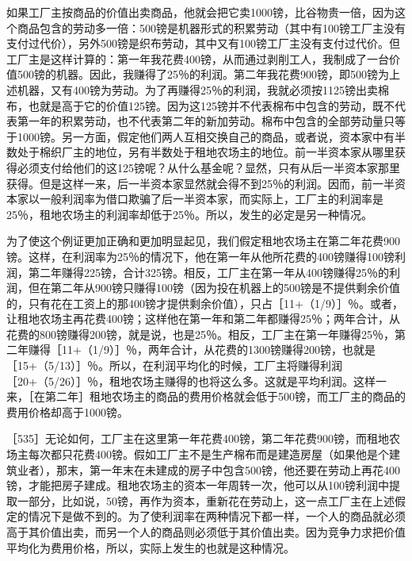 如果工厂主按商品的价值出卖商品，他就会把它卖1000镑，比谷物贵一倍，因为这个商品包含的劳动多一倍：500镑是机器形式的积累劳动（其中有100镑工厂主没有支付过代价），另外500镑是织布劳动，其中又有100镑工厂主没有支付过代价。但工厂主是这样计算的：第一年我花费400镑，从而通过剥削工人，我制成了一台价值500镑的机器。因此，我赚得了25％的利润。第二年我花费900镑，即500镑为上述机器，又有400镑为劳动。为了再赚得25％的利润，我就必须按1125镑出卖棉布，也就是高于它的价值125镑。因为这125镑并不代表棉布中包含的劳动，既不代表第一年的积累劳动，也不代表第二年的新加劳动。棉布中包含的全部劳动量只等于1000镑。另一方面，假定他们两人互相交换自己的商品，或者说，资本家中有半数处于棉织厂主的地位，另有半数处于租地农场主的地位。前一半资本家从哪里获得必须支付给他们的这125镑呢？从什么基金呢？显然，只有从后一半资本家那里获得。但是这样一来，后一半资本家显然就会得不到25％的利润。因而，前一半资本家以一般利润率为借口欺骗了后一半资本家，而实际上，工厂主的利润率是25％，租地农场主的利润率却低于25％。所以，发生的必定是另一种情况。

为了使这个例证更加正确和更加明显起见，我们假定租地农场主在第二年花费900镑。这样，在利润率为25％的情况下，他在第一年从他所花费的400镑赚得100镑利润，第二年赚得225镑，合计325镑。相反，工厂主在第一年从400镑赚得25％的利润，但在第二年从900镑只赚得100镑（因为投在机器上的500镑是不提供剩余价值的，只有花在工资上的那400镑才提供剩余价值），只占［11+（1/9）］％。或者，让租地农场主再花费400镑；这样他在第一年和第二年都赚得25％；两年合计，从花费的800镑赚得200镑，就是说，也是25％。相反，工厂主在第一年赚得25％，第二年赚得［11+（1/9）］％，两年合计，从花费的1300镑赚得200镑，也就是［15+（5/13）］％。所以，在利润平均化的时候，工厂主将赚得利润［20+（5/26）］％，租地农场主赚得的也将这么多。这就是平均利润。这样一来，［在第二年］租地农场主的商品的费用价格就会低于500镑，而工厂主的商品的费用价格却高于1000镑。

［535］无论如何，工厂主在这里第一年花费400镑，第二年花费900镑，而租地农场主每次都只花费400镑。假如工厂主不是生产棉布而是建造房屋（如果他是个建筑业者），那末，第一年末在未建成的房子中包含500镑，他还要在劳动上再花400镑，才能把房子建成。租地农场主的资本一年周转一次，他可以从100镑利润中提取一部分，比如说，50镑，再作为资本，重新花在劳动上，这一点工厂主在上述假定的情况下是做不到的。为了使利润率在两种情况下都一样，一个人的商品就必须高于其价值出卖，而另一个人的商品则必须低于其价值出卖。因为竞争力求把价值平均化为费用价格，所以，实际上发生的也就是这种情况。

